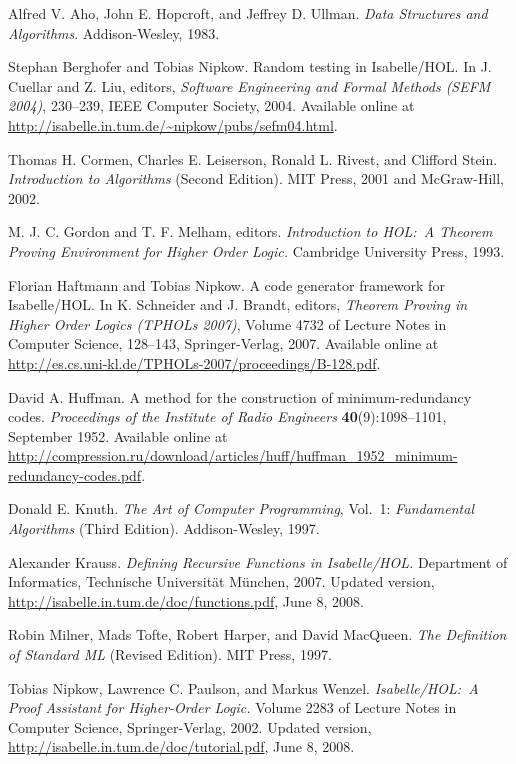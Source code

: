 \documentclass[11pt,a4paper]{article}
\begin{document}
\begin{thebibliography}{[9]}

 Alfred V. Aho, John E. Hopcroft, and Jeffrey D.
Ullman. \textsl{Data Structures and Algorithms}. Addison-Wesley, 1983.

 Stephan Berghofer and Tobias Nipkow.
Random testing in Isabelle/HOL. In J. Cuellar and Z. Liu, editors,
{\sl Software Engineering and Formal Methods (SEFM 2004)}, 230--239,
IEEE Computer Society, 2004. Available online at
\url{http://isabelle.in.tum.de/~nipkow/pubs/sefm04.html}.

 Thomas H. Cormen, Charles E. Leiserson,
Ronald L. Rivest, and Clifford Stein. {\sl Introduction to Algorithms\/}
(Second Edition). MIT Press, 2001 and McGraw-Hill, 2002.

 M. J. C. Gordon and T. F. Melham, editors.
{\sl Introduction to HOL:\ A Theorem Proving Environment for Higher Order
Logic.} Cambridge University Press, 1993.

 Florian Haftmann and Tobias Nipkow.
A code generator framework for Isabelle/HOL. In K. Schneider and J. Brandt,
editors, {\sl Theorem Proving in Higher Order Logics (TPHOLs 2007)},
Volume 4732 of Lecture Notes in Computer Science, 128--143, Springer-Verlag,
2007. Available online at
\url{http://es.cs.uni-kl.de/TPHOLs-2007/proceedings/B-128.pdf}.

 David A. Huffman. A method for the construction of
minimum-redundancy codes. {\sl Proceedings of the Institute of Radio Engineers}
{\bf 40}(9):1098--1101, September 1952. Available online at
\url{http://compression.ru/download/articles/huff/huffman_1952_minimum-redundancy-codes.pdf}.

 Donald E. Knuth. {\sl The Art of Computer Programming},
Vol.~1: {\sl Fundamental Algorithms\/} (Third Edition). Addison-Wesley, 1997.

 Alexander Krauss. {\sl Defining Recursive Functions in
Isabelle/HOL.} Department of Informatics, Technische Universit\"at M\"unchen,
2007. Updated version, \url{http://isabelle.in.tum.de/doc/functions.pdf},
June 8, 2008.

 Robin Milner, Mads Tofte, Robert Harper, and David
MacQueen. {\sl The Definition of Standard ML\/} (Revised Edition). MIT Press,
1997.

 Tobias Nipkow, Lawrence C. Paulson, and
Markus Wenzel. {\sl Is\-a\-belle/HOL:\ A Proof Assistant for
Higher-Order Logic.} Volume 2283 of Lecture Notes in Computer Science,
Springer-Verlag, 2002. Updated version,
\url{http://isabelle.in.tum.de/doc/tutorial.pdf}, June 8, 2008.


\end{thebibliography}
\end{document}
